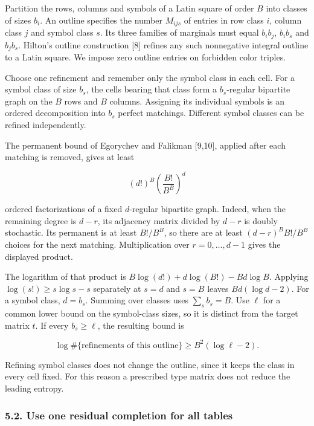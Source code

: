 \documentclass[english,11pt,a4paper]{article}
\begin{document}
Partition the rows, columns and symbols of a Latin square of order \(B\) into classes of sizes \(b_i\). An outline specifies the number \(M_{ijs}\) of entries in row class \(i\), column class \(j\) and symbol class \(s\). Its three families of marginals must equal \(b_ib_j\), \(b_ib_s\) and \(b_jb_s\). Hilton's outline construction {[}8{]} refines any such nonnegative integral outline to a Latin square. We impose zero outline entries on forbidden color triples.

Choose one refinement and remember only the symbol class in each cell. For a symbol class of size \(b_s\), the cells bearing that class form a \(b_s\)-regular bipartite graph on the \(B\) rows and \(B\) columns. Assigning its individual symbols is an ordered decomposition into \(b_s\) perfect matchings. Different symbol classes can be refined independently.

The permanent bound of Egorychev and Falikman {[}9,10{]}, applied after each matching is removed, gives at least

\[(d!)^B\left(\frac{B!}{B^B}\right)^d\]

ordered factorizations of a fixed \(d\)-regular bipartite graph. Indeed, when the remaining degree is \(d-r\), its adjacency matrix divided by \(d-r\) is doubly stochastic. Its permanent is at least \(B!/B^B\), so there are at least \((d-r)^B B!/B^B\) choices for the next matching. Multiplication over \(r=0,\ldots,d-1\) gives the displayed product.

The logarithm of that product is \(B\log(d!)+d\log(B!)-Bd\log B\). Applying \(\log(s!)\ge s\log s-s\) separately at \(s=d\) and \(s=B\) leaves \(Bd(\log d-2)\). For a symbol class, \(d=b_s\). Summing over classes uses \(\sum_s b_s=B\). Use \(\ell\) for a common lower bound on the symbol-class sizes, so it is distinct from the target matrix \(t\). If every \(b_s\ge\ell\), the resulting bound is

\[\log\#\{\text{refinements of this outline}\}
\ge B^2(\log\ell-2).\tag{5.1}\]

Refining symbol classes does not change the outline, since it keeps the class in every cell fixed. For this reason a prescribed type matrix does not reduce the leading entropy.

\subsubsection{5.2. Use one residual completion for all tables}\label{use-one-residual-completion-for-all-tables}
\end{document}
